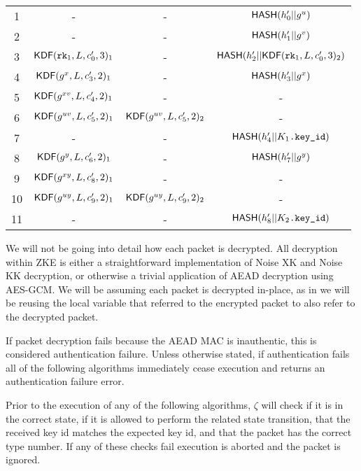 \documentclass{article}
\begin{document}
\begin{table}
\begin{tabular}{ | c | c | c | c | }
		1 & - & - & $\text{\sf HASH}(h_0'||g^u)$ \\
		2 & - & - & $\text{\sf HASH}(h_1'||g^v)$ \\
		3 & $\text{\sf KDF}(\texttt{rk}_1, L, c_0', 3)_1$ & - & $\text{\sf HASH}(h_2'||\text{\sf KDF}(\texttt{rk}_1, L, c_0', 3)_2)$ \\
		4 & $\text{\sf KDF}(g^x, L, c_3', 2)_1$ & - & $\text{\sf HASH}(h_3'||g^x)$ \\
		5 & $\text{\sf KDF}(g^{xv}, L, c_4', 2)_1$ & - & - \\
		6 & $\text{\sf KDF}(g^{uv}, L, c_5', 2)_1$ & $\text{\sf KDF}(g^{uv}, L, c_5', 2)_2$ & - \\
		7 & - & - & $\text{\sf HASH}(h_4'||K_1\texttt{.key\_id})$ \\
		\hline
		8 & $\text{\sf KDF}(g^y, L, c_6', 2)_1$ & - & $\text{\sf HASH}(h_7'||g^y)$ \\
		9 & $\text{\sf KDF}(g^{xy}, L, c_8', 2)_1$ & - & - \\
		10 & $\text{\sf KDF}(g^{uy}, L, c_9', 2)_1$ & $\text{\sf KDF}(g^{uy}, L, c_9', 2)_2$ & - \\
		11 & - & - & $\text{\sf HASH}(h_8'||K_2\texttt{.key\_id})$ \\
		\hline
	\end{tabular}
\end{table}

We will not be going into detail how each packet is decrypted. All decryption within ZKE is either a straightforward implementation of Noise XK and Noise KK decryption, or otherwise a trivial application of AEAD decryption using AES-GCM. We will be assuming each packet is decrypted in-place, as in we will be reusing the local variable that referred to the encrypted packet to also refer to the decrypted packet.

If packet decryption fails because the AEAD MAC is inauthentic, this is considered authentication failure. Unless otherwise stated, if authentication fails all of the following algorithms immediately cease execution and returns an authentication failure error.

Prior to the execution of any of the following algorithms, $\zeta$ will check if it is in the correct state, if it is allowed to perform the related state transition, that the received key id matches the expected key id, and that the packet has the correct type number. If any of these checks fail execution is aborted and the packet is ignored.
\end{document}
